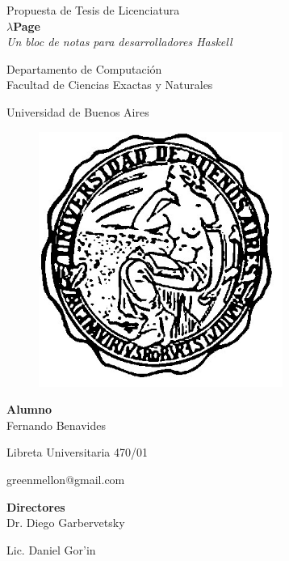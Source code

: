 \documentclass[a4paper]{article}
\begin{document}
	\thispagestyle{empty}
	\begin{center}
	{\Large Propuesta de Tesis de Licenciatura}\\[1em]
	{\huge \textbf{$\lambda$Page}}\\[0.5em]
	{\large \textit{Un bloc de notas para desarrolladores Haskell}}\\[1em]
	\par{}
	{\large Departamento de Computaci\'on}\\[0.5em]
	{\large Facultad de Ciencias Exactas y Naturales}\\[0.5em]
	{\large Universidad de Buenos Aires
	\begin{figure}[h]
		\begin{center}
		\includegraphics[width=80mm]{logoUba}
		\end{center}
	\end{figure}}
	\par{}
	{\Large \textbf{Alumno}}\\[0.8em]
	{\Large Fernando Benavides} \par
	{\Large Libreta Universitaria 470/01} \par
	{\Large greenmellon@gmail.com} \par
	\par{}
	{\Large \textbf{Directores}}\\[0.8em]
	{\Large Dr. Diego Garbervetsky} \par
	{\Large Lic. Daniel Gor'in}
	\end{center}
\end{document}
